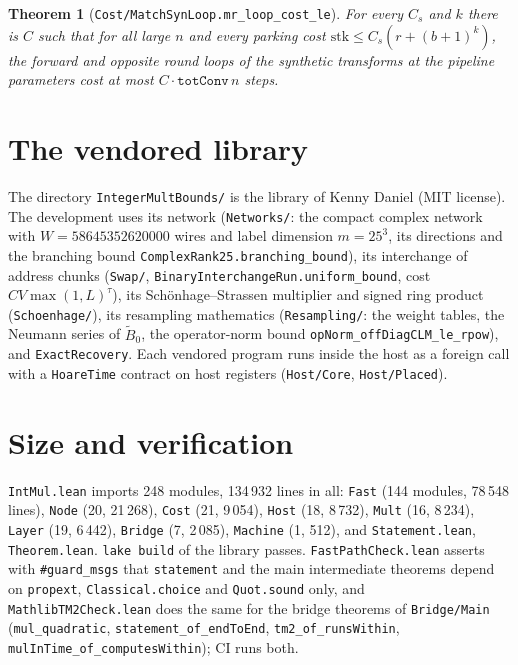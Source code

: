 \documentclass[11pt]{amsart}
\newtheorem{theorem}{Theorem}
\theoremstyle{remark}
\begin{document}
\begin{theorem}[\texttt{Cost/MatchSynLoop.mr\_loop\_cost\_le}]
For every $C_s$ and $k$ there is $C$ such that for all large $n$ and every parking cost
$\mathrm{stk}\le C_s(r+(b+1)^k)$, the forward and opposite round loops of the synthetic
transforms at the pipeline parameters cost at most $C\cdot\texttt{totConv}\,n$ steps.
\end{theorem}

\section{The vendored library}

The directory \texttt{IntegerMultBounds/} is the library of Kenny Daniel (MIT license). The
development uses its network (\texttt{Networks/}: the compact complex network with
$W=58645352620000$ wires and label dimension $m=25^3$, its directions and the branching bound
\texttt{ComplexRank25.branching\_bound}), its interchange of address chunks
(\texttt{Swap/}, \texttt{BinaryInterchangeRun.uniform\_bound}, cost $CV\max(1,L)^\tau$), its
Schönhage--Strassen multiplier and signed ring product (\texttt{Schoenhage/}), its resampling
mathematics (\texttt{Resampling/}: the weight tables, the Neumann series of $\widetilde B_0$,
the operator-norm bound \texttt{opNorm\_offDiagCLM\_le\_rpow}), and \texttt{ExactRecovery}.
Each vendored program runs inside the host as a foreign call with a \texttt{HoareTime}
contract on host registers (\texttt{Host/Core}, \texttt{Host/Placed}).

\section{Size and verification}

\texttt{IntMul.lean} imports 248 modules, 134\,932 lines in all: \texttt{Fast} (144 modules,
78\,548 lines), \texttt{Node} (20, 21\,268), \texttt{Cost} (21, 9\,054), \texttt{Host}
(18, 8\,732), \texttt{Mult} (16, 8\,234), \texttt{Layer} (19, 6\,442), \texttt{Bridge}
(7, 2\,085), \texttt{Machine} (1, 512), and \texttt{Statement.lean}, \texttt{Theorem.lean}.
\texttt{lake build} of the library passes. \texttt{FastPathCheck.lean} asserts with
\texttt{\#guard\_msgs} that \texttt{statement} and the main intermediate theorems depend on
\texttt{propext}, \texttt{Classical.choice} and \texttt{Quot.sound} only, and
\texttt{MathlibTM2Check.lean} does the same for the bridge theorems of \texttt{Bridge/Main}
(\texttt{mul\_quadratic}, \texttt{statement\_of\_endToEnd}, \texttt{tm2\_of\_runsWithin},
\texttt{mulInTime\_of\_computesWithin}); CI runs both.
\end{document}
